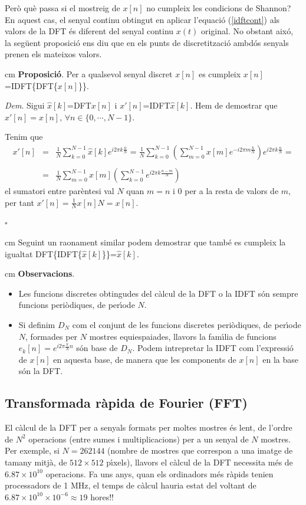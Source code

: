 \documentclass{article}
\begin{document}
Per\`o qu\`e passa si el mostreig de $x[n]$ no cumpleix les condicions de Shannon?
En aquest cas, el senyal continu obtingut en aplicar l'equaci\'o (\ref{idftcont})
als valors de la DFT \'es diferent del senyal continu $x(t)$ original. No obstant 
aix\'o, la seg\"uent proposici\'o ens diu que en els punts de discretitzaci\'o
ambd\'os senyals prenen els mateixos valors.

 cm
\noindent
{\bf Proposici\'o}. Per a qualsevol senyal discret $x[n]$ es cumpleix 
$x[n]$=IDFT\{DFT\{$x[n]$\}\}.

\noindent
{\it Dem}. Sigui $\hat{x}[k]$=DFT{$x[n]$} i $x'[n]$=IDFT{$\hat{x}[k]$}. Hem 
de demostrar que $x'[n]=x[n]$, $\forall n \in \{0,\cdots,N-1\}$.

\noindent
Tenim que
\[
\begin{array}{rcl}
x'[n] & = & \frac{1}{N} \sum_{k=0}^{N-1} \hat{x}[k] e^{i 2 \pi k \frac{n}{N}}=
\frac{1}{N} \sum_{k=0}^{N-1} \left( 
\sum_{m=0}^{N-1} x[m] e^{-i 2 \pi m \frac{k}{N}} \right) e^{i 2 \pi k \frac{n}{N}} =\\ \\
& = & \frac{1}{N} \sum_{m=0}^{N-1} x[m] \left( \sum_{k=0}^{N-1} 
e^{i 2 \pi k \frac{n-m}{N}} \right)
\end{array}
\]
\noindent
el sumatori entre par\`entesi val $N$ quan $m=n$ i $0$ per a la resta de valors de $m$,
per tant $x'[n]=\frac{1}{N} x[n] N=x[n]$.
\begin{flushright}
$\square$
\end{flushright}

 cm
Seguint un raonament similar podem demostrar que tamb\'e es cumpleix la igualtat 
DFT\{IDFT\{$\hat{x}[k]$\}\}=$\hat{x}[k]$. 


 cm
{\bf Observacions}.
\begin{itemize}
\item Les funcions discretes obtingudes del c\`alcul de la DFT o la IDFT s\'on sempre 
funcions peri\`odiques, de per\'\i ode $N$.
\item Si definim $D_N$ com el conjunt de les funcions discretes peri\`odiques, de 
per\'\i ode $N$, formades per $N$ mostres equiespaiades, llavors la fam\'\i lia
de funcions $e_k[n]=e^{i 2 \pi \frac{k}{N}n}$ s\'on base de $D_N$. Podem intrepretar 
la IDFT com l'expressi\'o de $x[n]$ en aquesta base, de manera que les components de
$x[n]$ en la base s\'on la DFT.
\end{itemize}


\subsection{Transformada r\`apida de Fourier (FFT)}
El c\`alcul de la DFT per a senyals formats per moltes mostres \'es lent, de l'ordre 
de $N^2$ operacions (entre sumes i multiplicacions) per a un senyal de $N$ mostres.
Per exemple, si $N=262144$ (nombre de mostres que correspon a una imatge de tamany
mitj\`a, de $512 \times 512$ p\'\i xels), llavors el c\`alcul de la DFT necessita
m\'es de $6.87 \times 10^{10}$ operacions. Fa uns anys, quan els ordinadors m\'es r\`apids
tenien processadors de 1 MHz, el temps de c\`alcul hauria estat del voltant de 
$6.87 \times 10^10 \times 10^{-6} \approx 19$ hores!! 
\end{document}
